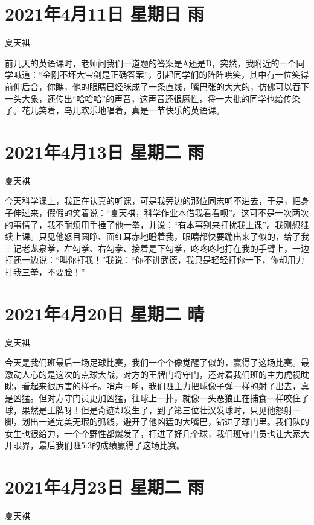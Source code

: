 \section{2021年4月11日 星期日 雨}

夏天褀

前几天的英语课时，老师问我们一道题的答案是A还是B，突然，我附近的一个同学喊道：“金刚不坏大宝剑是正确答案”，引起同学们的阵阵哄笑，其中有一位笑得前仰后合，你瞧，他的眼睛已经眯成了一条直线，嘴巴张的大大的，仿佛可以吞下一头大象，还传出“哈哈哈”的声音，这声音还很魔性，将一大批的同学也给传染了。花儿笑着，鸟儿欢乐地唱着，真是一节快乐的英语课。

\section{2021年4月13日 星期二 雨}

夏天褀

今天科学课上，我正在认真的听课，可是我旁边的那位同志听不进去，于是，把身子伸过来，假假的笑着说：“夏天褀，科学作业本借我看看呗”。这可不是一次两次的事情了，我不耐烦用手捶了他一拳，并说：“有本事别来打扰我上课”。我刚想继续上课。只见他怒目圆睁、面红耳赤地瞪着我，眼睛都快要蹦出来了似的，给了我三记老龙泉拳，左勾拳、右勾拳、接着是下勾拳，咚咚咚地打在我的手臂上，一边打还一边说：“叫你打我！”我说：“你不讲武德，我只是轻轻打你一下，你却用力打我三拳，不要脸！”

\section{2021年4月20日 星期二 晴}

夏天褀

今天是我们班最后一场足球比赛，我们一个个像觉醒了似的，赢得了这场比赛。最激动人心的是这次的点球大战，对方的王牌门将守门，还对着我们班的主力虎视眈眈，看起来很厉害的样子。哨声一响，我们班主力把球像子弹一样的射了出去，真是凶猛。但对方守门员更加凶猛，往球上一扑，就像一头恶狼正在捕食一样咬住了球，果然是王牌呀！但是奇迹却发生了，到了第三位壮汉发球时，只见他怒射一脚，划出一道完美无瑕的弧线，避开了他凶猛的大嘴巴，钻进了球门里。我们队的女生也很给力，一个个野性都爆发了，打进了好几个球，我们班守门员也让大家大开眼界，最后我们班5:3的成绩赢得了这场比赛。

\section{2021年4月23日 星期二 雨}

夏天褀

